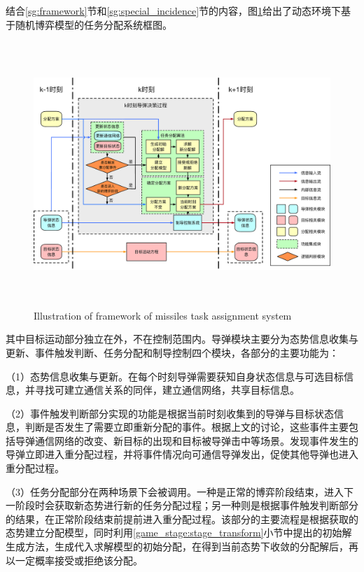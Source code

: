 结合\ref{sg:framework}节和\ref{sg:special_incidence}节的内容，图\ref{fig:framework}给出了动态环境下基于随机博弈模型的任务分配系统框图。

\begin{figure}[!htp]
  \centering
  \includegraphics[height=10cm]{stochastic_game/framework}
  {Illustration of framework of missiles task assignment system}
  \label{fig:framework}
\end{figure}

其中目标运动部分独立在外，不在控制范围内。导弹模块主要分为态势信息收集与更新、事件触发判断、任务分配和制导控制四个模块，各部分的主要功能为：

（1）态势信息收集与更新。在每个时刻导弹需要获知自身状态信息与可选目标信息，并寻找可建立通信关系的同伴，建立通信网络，共享目标信息。

（2）事件触发判断部分实现的功能是根据当前时刻收集到的导弹与目标状态信息，判断是否发生了需要立即重新分配的事件。根据上文的讨论，这些事件主要包括导弹通信网络的改变、新目标的出现和目标被导弹击中等场景。发现事件发生的导弹立即进入重分配过程，并将事件情况向可通信导弹发出，促使其他导弹也进入重分配过程。

（3）任务分配部分在两种场景下会被调用。一种是正常的博弈阶段结束，进入下一阶段时会获取新态势进行新的任务分配过程；另一种则是根据事件触发判断部分的结果，在正常阶段结束前提前进入重分配过程。该部分的主要流程是根据获取的态势建立分配模型，同时利用\ref{game_stage:stage_transform}小节中提出的初始解生成方法，生成代入求解模型的初始分配，在得到当前态势下收敛的分配解后，再以一定概率接受或拒绝该分配。

